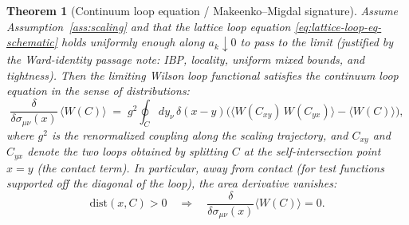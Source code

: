 \documentclass[11pt]{article}
\newtheorem{theorem}{Theorem}[section]
\theoremstyle{definition}
\newcommand{\1}{\mathbf{1}}
\begin{document}
\begin{theorem}[Continuum loop equation / Makeenko--Migdal signature]
\label{thm:MM}
Assume Assumption~\ref{ass:scaling} and that the lattice loop equation \eqref{eq:lattice-loop-eq-schematic} holds uniformly enough along $a_k\downarrow 0$ to pass to the limit (justified by the Ward-identity passage note: IBP, locality, uniform mixed bounds, and tightness).
Then the limiting Wilson loop functional satisfies the continuum loop equation in the sense of distributions:
\begin{equation}
\label{eq:MM}
\frac{\delta}{\delta \sigma_{\mu\nu}(x)}\,\langle W(C)\rangle
\;=\;g^2\oint_C dy_\nu\,\delta(x-y)\Big(\langle W(C_{xy})\,W(C_{yx})\rangle - \langle W(C)\rangle\Big),
\end{equation}
where $g^2$ is the renormalized coupling along the scaling trajectory, and $C_{xy}$ and $C_{yx}$ denote the two loops obtained by splitting $C$ at the self-intersection point $x=y$ (the contact term). In particular, away from contact (for test functions supported off the diagonal of the loop), the area derivative vanishes:
\begin{equation}
\mathrm{dist}(x,C)>0\quad\Longrightarrow\quad \frac{\delta}{\delta \sigma_{\mu\nu}(x)}\langle W(C)\rangle=0.
\end{equation}
\end{theorem}
\end{document}
